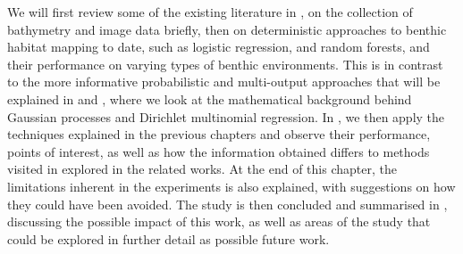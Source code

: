 We will first review some of the existing literature in , on the collection of bathymetry and image data briefly, then on deterministic approaches to benthic habitat mapping to date, such as logistic regression, and random forests, and their performance on varying types of benthic environments. This is in contrast to the more informative probabilistic and multi-output approaches that will be explained in  and , where we look at the mathematical background behind Gaussian processes and Dirichlet multinomial regression. In , we then apply the techniques explained in the previous chapters and observe their performance, points of interest, as well as how the information obtained differs to methods visited in explored in the related works. At the end of this chapter, the limitations inherent in the experiments is also explained, with suggestions on how they could have been avoided. The study is then concluded and summarised in , discussing the possible impact of this work, as well as areas of the study that could be explored in further detail as possible future work.
